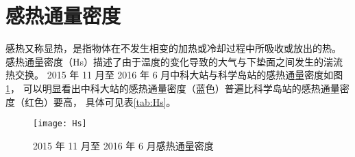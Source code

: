 \section{感热通量密度}
感热又称显热，是指物体在不发生相变的加热或冷却过程中所吸收或放出的热。
感热通量密度（Hs）描述了由于温度的变化导致的大气与下垫面之间发生的湍流热交换。\cite{tagkey2006}
2015 年 11 月至 2016 年 6 月中科大站与科学岛站的感热通量密度如图\ref{fig:Hs}，
可以明显看出中科大站的感热通量密度（蓝色）普遍比科学岛站的感热通量密度（红色）要高，
具体可见表\ref{tab:Hs}。
\begin{figure}[H]
\centering
\texttt{[image: Hs]}
\caption{2015 年 11 月至 2016 年 6 月感热通量密度}\label{fig:Hs}
\end{figure}

